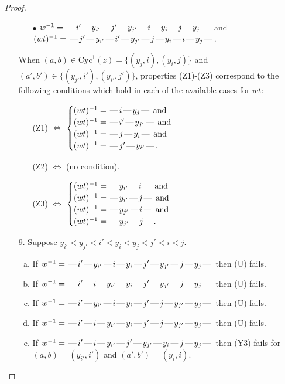 \documentclass[10pt]{article}
\theoremstyle{definition}
\theoremstyle{definition}
\def\dash{\text{\hspace{0.5mm}---\hspace{0.5mm}}}
\def\Cyc{\mathrm{Cyc}}
\begin{document}
\begin{proof}
\begin{enumerate}
\begin{enumerate}
\item[$\bullet$] $w^{-1} = \dash i'\dash y_{i'}\dash j'\dash y_{j'}\dash i\dash y_i\dash j\dash y_j\dash $ and $(wt)^{-1} = \dash j'\dash y_{i'}\dash i'\dash y_{j'}\dash j\dash y_i\dash i\dash y_j\dash $.
\end{enumerate}
When $(a,b)\in\Cyc^1(z)=\{(y_j,i),(y_i,j)\}$ and $(a',b')\in\{(y_{j'},i'),(y_{i'},j')\}$,
properties (Z1)-(Z3) correspond to the following conditions which
hold in each of the available cases for $wt$:
\begin{enumerate}
\item[](Z1) $\Leftrightarrow$ $\begin{cases}\text{$(wt)^{-1} = \dash i \dash y_j \dash$}\text{ and }\\
\text{$(wt)^{-1} = \dash i' \dash y_{j'} \dash$}\text{ and }\\
\text{$(wt)^{-1} = \dash j \dash y_i \dash$}\text{ and }\\
\text{$(wt)^{-1} = \dash j' \dash y_{i'} \dash$}.\end{cases}$
\item[](Z2) $\Leftrightarrow$ (no condition).
\item[](Z3) $\Leftrightarrow$ $\begin{cases}\text{$(wt)^{-1} = \dash y_{i'} \dash i \dash$}\text{ and }\\
\text{$(wt)^{-1} = \dash y_{i'} \dash j \dash$}\text{ and }\\
\text{$(wt)^{-1} = \dash y_{j'} \dash i \dash$}\text{ and }\\
\text{$(wt)^{-1} = \dash y_{j'} \dash j \dash$}.\end{cases}$
\end{enumerate}
\item[$9$.] Suppose $y_{i'} < y_{j'} < i' < y_i < y_j < j' < i < j$.
\begin{enumerate}[(a)]
\item If $w^{-1} = \dash i'\dash y_{i'}\dash i\dash y_i\dash j'\dash y_{j'}\dash j\dash y_j\dash $ then (U) fails.
\item If $w^{-1} = \dash i'\dash i\dash y_{i'}\dash y_i\dash j'\dash y_{j'}\dash j\dash y_j\dash $ then (U) fails.
\item If $w^{-1} = \dash i'\dash y_{i'}\dash i\dash y_i\dash j'\dash j\dash y_{j'}\dash y_j\dash $ then (U) fails.
\item If $w^{-1} = \dash i'\dash i\dash y_{i'}\dash y_i\dash j'\dash j\dash y_{j'}\dash y_j\dash $ then (U) fails.
\item If $w^{-1} = \dash i'\dash i\dash y_{i'}\dash j'\dash y_{j'}\dash y_i\dash j\dash y_j\dash $ then (Y3) fails for $(a,b)=(y_{i'},i')$ and $(a',b')=(y_i,i)$.

\end{enumerate}
\end{enumerate}
\end{proof}
\end{document}
